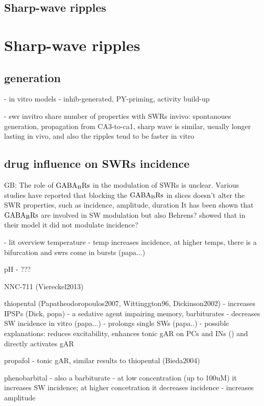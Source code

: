   \subsection{Sharp-wave ripples}

\section{Sharp-wave ripples}
  \subsection{generation}
    - in vitro models
    - inhib-generated, PY-priming, activity build-up

    - swr invitro share number of properties with SWRs invivo: spontanoues generation, propagation from CA3-to-ca1, sharp wave is similar, usually longer lasting in vivo, and also the ripples tend to be faster in vitro
  \subsection{drug influence on SWRs incidence}
  
  GB: 
    The role of $\rm GABA_B Rs$ in the modulation of SWRs is unclear. Various
    studies have reported that blocking the $\rm GABA_B Rs$ in slices doesn't
    alter the SWR properties, such as incidence, amplitude, duration
    \cite{Hollnagel2014, Hofer2015}
    It has been shown that $\rm GABA_B Rs$ are involved in SW modulation 
    \cite{Maier2102}
    but also Behrens? showed that in their model it did not modulate incidence?



    - lit overview
    temperature
    - temp increases incidence, at higher temps, there is a bifurcation and swrs come in bursts (papa...)

pH
  - ???

NNC-711 (Viereckel2013)

thiopental (Papatheodoropoulos2007, Wittinggton96, Dickinson2002)
  - increases IPSPs (Dick, popa)
  - a sedative agent impairing memory, barbiturates
  - decreases SW incidence in vitro (papa...)
  - prolongs single SWs (papa..)
  - possible explanations: reduces excitability, enhances tonic gAR on PCs and INs () and directly activates gAR

propafol
  - tonic gAR, similar results to thiopental (Bieda2004)

phenobarbital
  - also a barbiturate
  - at low concentration (up to 100uM) it increases SW incidence; at higher concetration it decreases incidence
  - increases amplitude 

